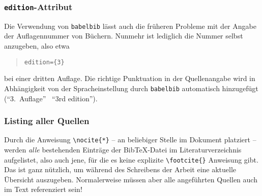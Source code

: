 \subsubsection{\texttt{edition}-Attribut}

Die Verwendung von \verb!babelbib! lässt auch die früheren Probleme mit der
Angabe der Auflagennummer von Büchern. Nunmehr ist lediglich die Nummer selbst anzugeben, also etwa
\begin{quote}
\verb!edition={3}!
\end{quote}
bei einer dritten Auflage. Die richtige Punktuation in der Quellenangabe wird in Abhängigkeit von der Spracheinstellung durch \texttt{babelbib} automatisch hinzugefügt ("`3.\ Auflage"' \bzw\ "`3rd edition"').


\subsubsection{Listing aller Quellen}

Durch die Anweisung \verb!\nocite{*}! -- an beliebiger Stelle im Dokument platziert -- werden \emph{alle} bestehenden Einträge der BibTeX-Datei im Literaturverzeichnis aufgelistet, also auch jene, für die es keine explizite \verb!\footcite{}! Anweisung gibt. Das ist ganz nützlich, um während des Schreibens der Arbeit eine aktuelle Übersicht auszugeben. Normalerweise müssen aber alle angeführten Quellen auch im Text referenziert sein!


